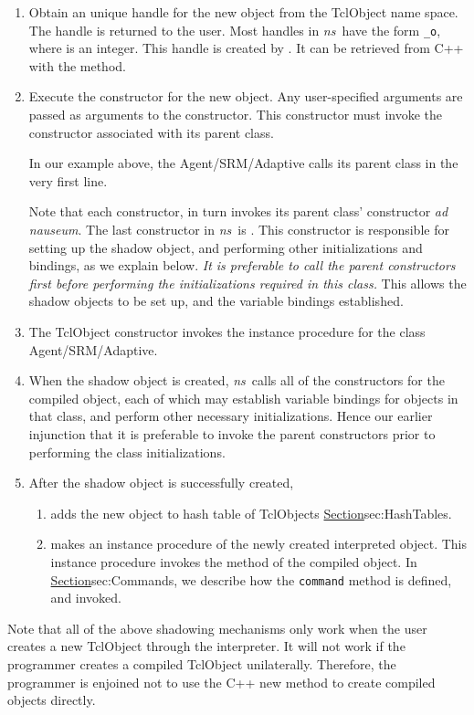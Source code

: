\begin{enumerate}
\item
  Obtain an unique handle for the new object   from the TclObject name space.
  The handle is returned to the user.
  Most handles in \emph{ns}\ have the form {\tt \_o}, where 
  is an integer.  This handle is created by
  .
  It can be retrieved from C++ with the
  method.
\item Execute the constructor for the new object.
  Any user-specified arguments are passed as arguments to the constructor.
  This constructor must invoke the constructor
  associated with its parent class.

  In our example above, the Agent/SRM/Adaptive calls its parent class
  in the very first line.  

  Note that each constructor,
  in turn invokes its parent class' constructor \textit{ad nauseum}.
  The last constructor in \emph{ns}\ is
  .
  This constructor is responsible for setting up the shadow object, and 
  performing other initializations and bindings, as we explain below.
  \emph{It is preferable to call the parent constructors first before
    performing the initializations required in this class.}
  This allows the shadow objects to be set up,
  and the variable bindings established.
\item The TclObject constructor invokes the instance procedure
   for the class Agent/SRM/Adaptive.
\item When the shadow object is created,
  \emph{ns}\ calls all of the constructors for the compiled object,
  each of which may establish variable bindings for objects in that class,
  and perform other necessary initializations.
  Hence our earlier injunction that it is preferable to invoke the parent
  constructors prior to performing the class initializations.
\item After the shadow object is successfully created,
  \begin{enumerate}
  \item adds the new object to hash table of TclObjects
        \href{described earlier}{Section}{sec:HashTables}.
  \item makes  an instance procedure of the newly created
    interpreted object.
    This instance procedure
    invokes the  method of the compiled object.
    In \href{a later subsection}{Section}{sec:Commands},
    we describe how the {\tt command} method is defined, and invoked.
  \end{enumerate}
\end{enumerate}
Note that all of the above shadowing mechanisms only work when
the user creates a new TclObject through the interpreter.
It will not work if the programmer creates a compiled TclObject unilaterally.
Therefore, the programmer is enjoined not to use the C++ new method
to create compiled objects directly.

